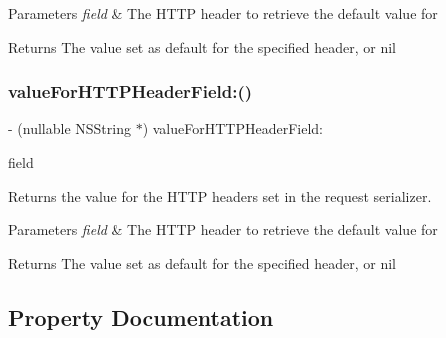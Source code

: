 \begin{DoxyParams}{Parameters}
{\em field} & The H\+T\+TP header to retrieve the default value for\\
\hline
\end{DoxyParams}
\begin{DoxyReturn}{Returns}
The value set as default for the specified header, or {\ttfamily nil} 
\end{DoxyReturn}
\mbox{\label{interface_a_f_h_t_t_p_request_serializer_a11dac7e7ab325f1e937c717f8c4e25b4}} 
\subsubsection{\texorpdfstring{value\+For\+H\+T\+T\+P\+Header\+Field\+:()}{valueForHTTPHeaderField:()}\hspace{0.1cm}{\footnotesize\ttfamily [3/3]}}
{\footnotesize\ttfamily -\/ (nullable N\+S\+String $\ast$) value\+For\+H\+T\+T\+P\+Header\+Field\+: \begin{DoxyParamCaption}\item[{(N\+S\+String $\ast$)}]{field }\end{DoxyParamCaption}}

Returns the value for the H\+T\+TP headers set in the request serializer.


\begin{DoxyParams}{Parameters}
{\em field} & The H\+T\+TP header to retrieve the default value for\\
\hline
\end{DoxyParams}
\begin{DoxyReturn}{Returns}
The value set as default for the specified header, or {\ttfamily nil} 
\end{DoxyReturn}


\subsection{Property Documentation}
\mbox{\label{interface_a_f_h_t_t_p_request_serializer_ad1e2a4f25d1f250c8a702c3b0d9e6a8b}} 
